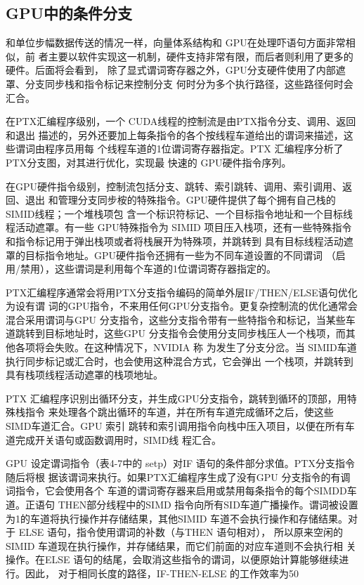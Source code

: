 \subsection{GPU中的条件分支}

和单位步幅数据传送的情况一样，向量体系结构和 GPU在处理吓语句方面非常相似，前
者主要以软件实现这一机制，硬件支持非常有限，而后者则利用了更多的硬件。后面将会看到，
除了显式谓词寄存器之外，GPU分支硬件使用了内部遮罩、分支同步栈和指令标记来控制分支
何时分为多个执行路径，这些路径何时会汇合。

在PTX汇编程序级别，一个 CUDA线程的控制流是由PTX指令分支、调用、返回和退出
描述的，另外还要加上每条指令的各个按线程车道给出的谓词来描述，这些谓词由程序员用每
个线程车道的1位谓词寄存器指定。PTX 汇编程序分析了 PTX分支图，对其进行优化，实现最
快速的 GPU硬件指令序列。

在GPU硬件指令级别，控制流包括分支、跳转、索引跳转、调用、索引调用、返回、退出
和管理分支同步桉的特殊指令。GPU硬件提供了每个拥有自己栈的SIMID线程；一个堆栈项包
含一个标识符标记、一个目标指令地址和一个目标线程活动遮罩。有一些 GPU特殊指令为 SIMID
项目压入栈项，还有一些特殊指令和指令标记用于弹出栈项或者将栈展开为特殊项，并跳转到
具有目标线程活动遮罩的目标指令地址。GPU硬件指令还拥有一些为不同车道设置的不同谓词
（启用/禁用），这些谓词是利用每个车道的1位谓词寄存器指定的。

PTX汇编程序通常会将用PTX分支指令编码的简单外层IF/THEN/ELSE语句优化为设有谓
词的GPU指令，不来用任何GPU分支指令。更复杂控制流的优化通常会混合采用谓词与GPU
分支指令，这些分支指令带有一些特指令和标记，当某些车道跳转到目标地址时，这些GPU
分支指令会使用分支同步栈压人一个栈项，而其他各项将会失败。在这种情况下，NVIDIA 称
为发生了分支分岔。当 SIMID车道执行同步标记或汇合时，也会使用这种混合方式，它会弹出
一个栈项，并跳转到具有栈项线程活动遮罩的栈项地址。

PTX 汇编程序识别出循环分支，并生成GPU分支指令，跳转到循环的顶部，用特殊栈指令
来处理各个跳出循环的车道，并在所有车道完成循环之后，使这些 SIMD车道汇合。GPU 索引
跳转和索引调用指令向栈中压入项目，以便在所有车道完成开关语句或函数调用时，SIMD线
程汇合。

GPU 设定谓词指令（表4-7中的 setp）对IF 语句的条件部分求值。PTX分支指令随后将根
据该谓词来执行。如果PTX汇编程序生成了没有GPU 分支指令的有调词指令，它会使用各个
车道的谓词寄存器来启用或禁用每条指令的每个SIMDD车道。正语句 THEN部分线程中的SIMD
指令向所有SID车道广播操作。谓词被设置为1的车道将执行操作并存储结果，其他SIMID
车道不会执行操作和存储结果。对于 ELSE 语句，指令使用谓词的补数（与THEN 语句相对），
所以原来空闲的SIMID 车道现在执行操作，并存储结果，而它们前面的对应车道则不会执行相
关操作。在ELSE 语句的结尾，会取消这些指令的谓词，以便原始计算能够继续进行。因此，
对于相同长度的路径，IF-THEN-ELSE 的工作效率为50%

